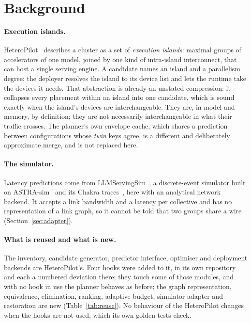 \section{Background}
\label{sec:background}



\paragraph{Execution islands.}
HeteroPilot~\cite{heteropilot} describes a cluster as a set of \emph{execution
islands}: maximal groups of accelerators of one model, joined by one kind of
intra-island interconnect, that can host a single serving engine. A candidate
names an island and a parallelism degree; the deployer resolves the island to
its device list and lets the runtime take the devices it needs. That
abstraction is already an unstated compression: it collapses every placement
within an island into one candidate, which is sound exactly when the island's
devices are interchangeable. They are, in model and memory, by definition; they
are not necessarily interchangeable in what their traffic crosses. The
planner's own envelope cache, which shares a prediction between configurations
whose \emph{twin} keys agree, is a different and deliberately approximate
merge, and is not replaced here.

\paragraph{The simulator.}
Latency predictions come from LLMServingSim~\cite{llmservingsim,llmservingsim2},
a discrete-event simulator built on ASTRA-sim~\cite{astrasim,astrasim2} and
its Chakra traces~\cite{chakra}, here with an analytical network backend. It accepts a link bandwidth and a latency per collective and
has no representation of a link graph, so it cannot be told that two groups
share a wire (Section~\ref{sec:adapter}).

\paragraph{What is reused and what is new.}
The inventory, candidate generator, predictor interface, optimiser and
deployment backends are HeteroPilot's. Four hooks were added to it,
in its own repository and each a numbered deviation there; they touch some of
those modules, and with no hook in use the planner behaves as before; the graph
representation, equivalence, elimination, ranking, adaptive budget, simulator
adapter and restoration are new (Table~\ref{tab:reuse}). No behaviour of the
HeteroPilot changes when the hooks are not used, which its own golden
tests check.
